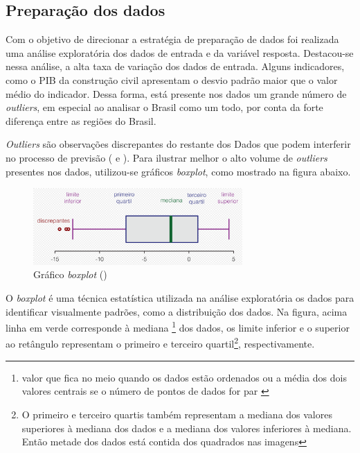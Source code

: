 \subsection{Preparação dos dados}

Com o objetivo de direcionar a estratégia de preparação de dados
foi realizada uma análise exploratória dos dados de 
entrada e da variável resposta. 
Destacou-se nessa análise, a alta
taxa de variação dos dados de entrada. Alguns indicadores, como o PIB
da construção civil apresentam
o desvio padrão maior que o valor médio do indicador. Dessa 
forma, está presente nos dados um grande número de \textit{outliers},
em especial ao analisar o Brasil como um todo, por conta da 
forte diferença entre as regiões do Brasil. 


\textit{Outliers} são observações discrepantes do restante dos Dados
que podem interferir no processo de previsão (\cite{outliers} e \cite{tukey77}).
Para ilustrar melhor o alto volume de \textit{outliers} presentes
nos dados, utilizou-se gráficos \textit{boxplot}, como mostrado na 
figura abaixo.

\begin{figure}[H]
    \centering
    \includegraphics[width=8cm]{../figuras/explicacao-boxplot.png}
    \caption{Gráfico \textit{boxplot} (\cite{explicacao-boxplot})}
    \label{fig:boxplot}
\end{figure}

O \textit{boxplot} \cite{boxplot} é
uma técnica estatística utilizada na análise exploratória
os dados para identificar visualmente padrões, como a distribuição
dos dados. Na figura, acima linha em verde corresponde à mediana \footnote{
valor que fica no meio quando os dados estão ordenados ou a média
dos dois valores centrais se o número de pontos de dados for par
\cite{boxplot-stat}} 
dos dados, os limite inferior e o superior ao retângulo representam
o primeiro e terceiro quartil\footnote{O primeiro e terceiro 
quartis também representam a mediana dos valores superiores
à mediana dos dados e a mediana dos valores inferiores à mediana. Então metade
dos dados está contida dos quadrados nas imagens}, respectivamente. 

